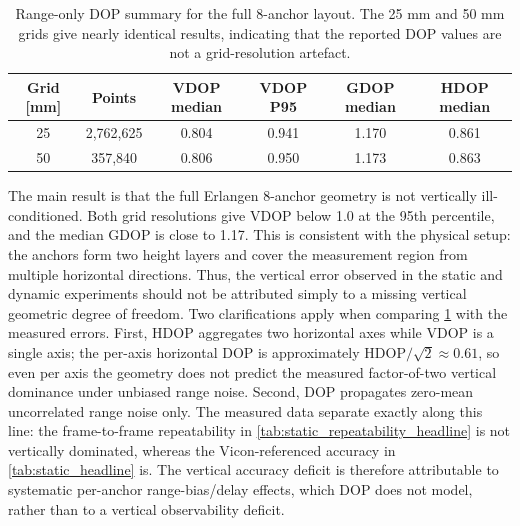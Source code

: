 \documentclass[11pt,a4paper]{article}
\begin{document}
\begin{table}[H]
\centering
\caption{Range-only DOP summary for the full 8-anchor layout.  The 25 mm and 50 mm grids give nearly identical results, indicating that the reported DOP values are not a grid-resolution artefact.}
\label{tab:dop_grid_summary}
\small
\begin{tabular}{c c c c c c}
\toprule
Grid [mm] & Points & VDOP median & VDOP P95 & GDOP median & HDOP median \\
\midrule
25 & 2,762,625 & 0.804 & 0.941 & 1.170 & 0.861 \\
50 &   357,840 & 0.806 & 0.950 & 1.173 & 0.863 \\
\bottomrule
\end{tabular}
\end{table}

The main result is that the full Erlangen 8-anchor geometry is not vertically ill-conditioned.
Both grid resolutions give VDOP below 1.0 at the 95th percentile, and the median GDOP is close to 1.17.
This is consistent with the physical setup: the anchors form two height layers and cover the measurement region from multiple horizontal directions.
Thus, the vertical error observed in the static and dynamic experiments should not be attributed simply to a missing vertical geometric degree of freedom.
Two clarifications apply when comparing \cref{tab:dop_grid_summary} with the measured errors.
First, HDOP aggregates two horizontal axes while VDOP is a single axis; the per-axis horizontal DOP is approximately $\mathrm{HDOP}/\sqrt{2}\approx0.61$, so even per axis the geometry does not predict the measured factor-of-two vertical dominance under unbiased range noise.
Second, DOP propagates zero-mean uncorrelated range noise only.
The measured data separate exactly along this line: the frame-to-frame repeatability in \cref{tab:static_repeatability_headline} is not vertically dominated, whereas the Vicon-referenced accuracy in \cref{tab:static_headline} is.
The vertical accuracy deficit is therefore attributable to systematic per-anchor range-bias/delay effects, which DOP does not model, rather than to a vertical observability deficit.
\end{document}
